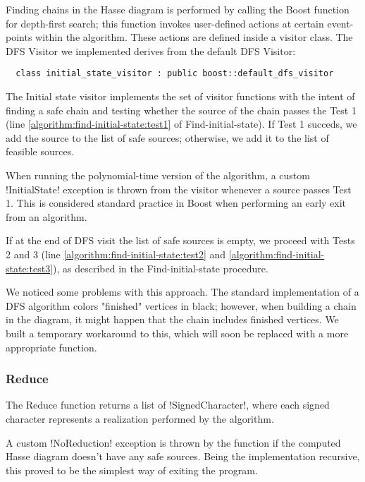 Finding chains in the Hasse diagram is performed by calling the Boost function for depth-first search; this function invokes user-defined actions at certain event-points within the algorithm.
These actions are defined inside a visitor class.
The DFS Visitor we implemented derives from the default DFS Visitor:

\begin{lstlisting}
  class initial_state_visitor : public boost::default_dfs_visitor
\end{lstlisting}

The Initial state visitor implements the set of visitor functions with the intent of finding a safe chain and testing whether the source of the chain passes the Test 1 (line \ref{algorithm:find-initial-state:test1} of Find-initial-state).
If Test 1 succeds, we add the source to the list of safe sources; otherwise, we add it to the list of feasible sources.

When running the polynomial-time version of the algorithm, a custom !InitialState! exception is thrown from the visitor whenever a source passes Test 1.
This is considered standard practice in Boost when performing an early exit from an algorithm.

If at the end of DFS visit the list of safe sources is empty, we proceed with Tests 2 and 3 (line \ref{algorithm:find-initial-state:test2} and \ref{algorithm:find-initial-state:test3}), as described in the Find-initial-state procedure.

We noticed some problems with this approach.
The standard implementation of a DFS algorithm colors "finished" vertices in black; however, when building a chain in the diagram, it might happen that the chain includes finished vertices.
We built a temporary workaround to this, which will soon be replaced with a more appropriate function.

\subsubsection{Reduce}\label{section:reduce}

The Reduce function returns a list of !SignedCharacter!, where each signed character represents a realization performed by the algorithm.

A custom !NoReduction! exception is thrown by the function if the computed Hasse diagram doesn't have any safe sources.
Being the implementation recursive, this proved to be the simplest way of exiting the program.


